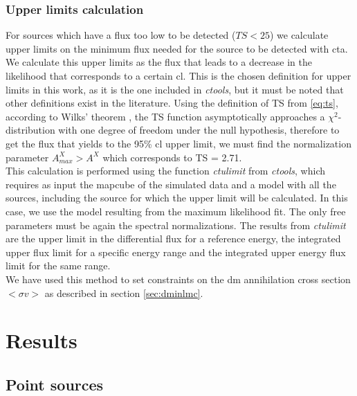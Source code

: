 \documentclass[main.tex]{subfiles}
\begin{document}
\subsubsection{Upper limits calculation} \label{sec:ulimits}

For sources which have a flux too low to be detected ($TS < 25$) we calculate upper limits on the minimum flux needed for the source to be detected with \gls{cta}. We calculate this upper limits as the flux that leads to a decrease in the likelihood that corresponds to a certain \gls{cl}. This is the chosen definition for upper limits in this work, as it is the one included in \textit{ctools}, but it must be noted that other definitions exist in the literature.
Using the definition of TS from \ref{eq:ts}, according to Wilks' theorem \cite{wilks1938}, the TS function asymptotically approaches a $\chi^2$-distribution with one degree of freedom under the null hypothesis, therefore to get the flux that yields to the 95\% \gls{cl} upper limit, we must find the normalization parameter $A^X_{max} > A^{X}$ which corresponds to TS = 2.71.\\
This calculation is performed using the function \textit{ctulimit} from \textit{ctools}, which requires as input the mapcube of the simulated data and a model with all the sources, including the source for which the upper limit will be calculated. In this case, we use the model resulting from the maximum likelihood fit. The only free parameters must be again the spectral normalizations. The results from \textit{ctulimit} are the upper limit in the differential flux for a reference energy, the integrated upper flux limit for a specific energy range and the integrated upper energy flux limit for the same range.\\
We have used this method to set constraints on the \gls{dm} annihilation cross section $<\sigma v>$ as described in section \ref{sec:dminlmc}.

\section{Results}\label{sec:results}
        
\subsection{Point sources}
\end{document}
